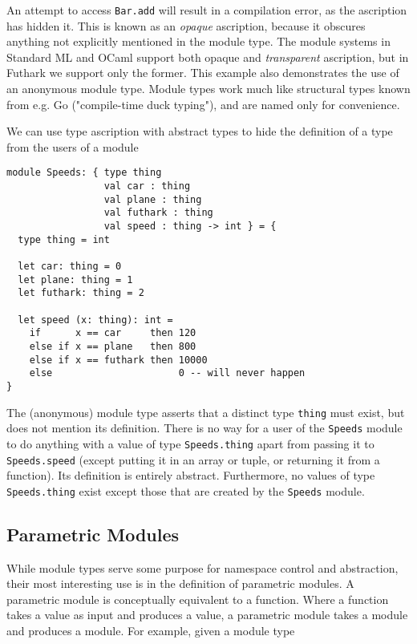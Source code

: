 \documentclass[oneside,11pt]{book}
\begin{document}
An attempt to access \texttt{Bar.add} will result in a compilation
error, as the ascription has hidden it.  This is known as an
\textit{opaque} ascription, because it obscures anything not
explicitly mentioned in the module type.  The module systems in
Standard ML and OCaml support both opaque and \textit{transparent}
ascription, but in Futhark we support only the former.  This example
also demonstrates the use of an anonymous module type.  Module types
work much like structural types known from e.g. Go ("compile-time duck
typing"), and are named only for convenience.

We can use type ascription with abstract types to hide the definition
of a type from the users of a module

\begin{lstlisting}
module Speeds: { type thing
                 val car : thing
                 val plane : thing
                 val futhark : thing
                 val speed : thing -> int } = {
  type thing = int

  let car: thing = 0
  let plane: thing = 1
  let futhark: thing = 2

  let speed (x: thing): int =
    if      x == car     then 120
    else if x == plane   then 800
    else if x == futhark then 10000
    else                      0 -- will never happen
}
\end{lstlisting}

The (anonymous) module type asserts that a distinct type \texttt{thing}
must exist, but does not mention its definition.  There is no way for
a user of the \texttt{Speeds} module to do anything with a value of type
\texttt{Speeds.thing} apart from passing it to \texttt{Speeds.speed} (except
putting it in an array or tuple, or returning it from a function).
Its definition is entirely abstract.  Furthermore, no values of type
\texttt{Speeds.thing} exist except those that are created by the \texttt{Speeds}
module.

\subsection{Parametric Modules}

While module types serve some purpose for namespace control and
abstraction, their most interesting use is in the definition of
parametric modules.  A parametric module is conceptually
equivalent to a function.  Where a function takes a value as input and
produces a value, a parametric module takes a module and produces a
module.  For example, given a module type
\end{document}
